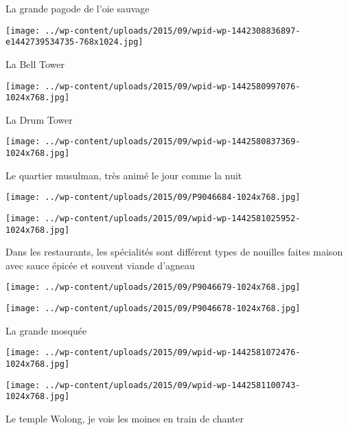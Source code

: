  La grande pagode de l'oie sauvage \newline
 \newline
\centerline{\texttt{[image: ../wp-content/uploads/2015/09/wpid-wp-1442308836897-e1442739534735-768x1024.jpg]} } 
 \newline
 La Bell Tower \newline
 \newline
\centerline{\texttt{[image: ../wp-content/uploads/2015/09/wpid-wp-1442580997076-1024x768.jpg]} } 
 \newline
 La Drum Tower \newline
 \newline
\centerline{\texttt{[image: ../wp-content/uploads/2015/09/wpid-wp-1442580837369-1024x768.jpg]} } 
 \newline
 Le quartier musulman, très animé le jour comme la nuit \newline
 \newline
\centerline{\texttt{[image: ../wp-content/uploads/2015/09/P9046684-1024x768.jpg]} } 
 \newline
 \newline
\centerline{\texttt{[image: ../wp-content/uploads/2015/09/wpid-wp-1442581025952-1024x768.jpg]} } 
 \newline
 Dans les restaurants, les spécialités sont différent types de nouilles faites maison avec sauce épicée et souvent viande d'agneau \newline
 \newline
\centerline{\texttt{[image: ../wp-content/uploads/2015/09/P9046679-1024x768.jpg]} } 
 \newline
 \newline
\centerline{\texttt{[image: ../wp-content/uploads/2015/09/P9046678-1024x768.jpg]} } 
 \newline
 La grande mosquée \newline
 \newline
\centerline{\texttt{[image: ../wp-content/uploads/2015/09/wpid-wp-1442581072476-1024x768.jpg]} } 
 \newline
 \newline
\centerline{\texttt{[image: ../wp-content/uploads/2015/09/wpid-wp-1442581100743-1024x768.jpg]} } 
 \newline
 Le temple Wolong, je vois les moines en train de chanter \newline
 \newline
